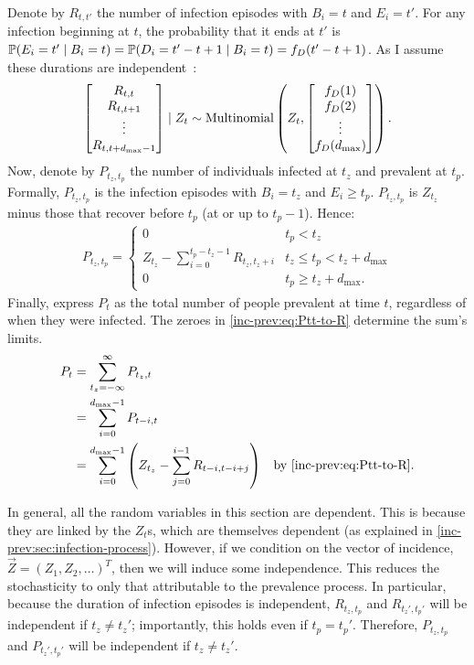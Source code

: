 \documentclass[thesis.tex]{subfiles}
\begin{document}
Denote by $R_{t,t'}$ the number of infection episodes with $B_i=t$ and $E_i=t'$.
For any infection beginning at $t$, the probability that it ends at $t'$ is $\operatorname{\mathbb{P}}(E_i = t' \mid B_i = t) = \operatorname{\mathbb{P}}(D_i = t' - t + 1 \mid B_i = t) = f_D(t' - t + 1)$.
As I assume these durations are independent~\autocite{paganoHIV}:
\begin{align}
\begin{bmatrix}
  R_{t,t} \\ R_{t,t+1} \\ \vdots \\ R_{t,t+d_\text{max}-1}
\end{bmatrix} \mid Z_t
\sim \operatorname{Multinomial} \left(
  Z_t, 
  \begin{bmatrix}
    f_D(1) \\ f_D(2) \\ \vdots \\ f_D(d_\text{max})
  \end{bmatrix}
\right).
\end{align}
Now, denote by $P_{t_z,t_p}$ the number of individuals infected at $t_z$ and prevalent at $t_p$.
Formally, $P_{t_z,t_p}$ is the infection episodes with $B_i = t_z$ and $E_i \geq t_p$.
$P_{t_z,t_p}$ is $Z_{t_z}$ minus those that recover before $t_p$ (\ie at or up to $t_p - 1$).
Hence:
\begin{align}
    P_{t_z,t_p} = \begin{cases}
      0 &t_p < t_z\\
      Z_{t_z} - \sum_{i=0}^{t_p-t_z-1} R_{t_z,t_z+i} &t_z \leq t_p < t_z + d_\text{max}\\
      0 &t_p \geq t_z + d_\text{max}.
  \end{cases} \label{inc-prev:eq:Ptt-to-R}
\end{align}
Finally, express $P_t$ as the total number of people prevalent at time $t$, regardless of when they were infected.
The zeroes in \cref{inc-prev:eq:Ptt-to-R} determine the sum's limits.
\begin{align}
  P_t
  &= \sum_{t_z=-\infty}^\infty P_{t_z,t} \\
  &= \sum_{i=0}^{\dmax-1} P_{t-i,t} \label{inc-prev:eq:Pt-to-Ptt} \\
  &= \sum_{i=0}^{\dmax-1} \left(Z_{t_z} - \sum_{j=0}^{i-1} R_{t-i,t-i+j} \right) &\text{by \cref{inc-prev:eq:Ptt-to-R}}\label{inc-prev:eq:Pt-to-Rtt}.
\end{align}

In general, all the random variables in this section are dependent.
This is because they are linked by the $Z_t$s, which are themselves dependent (as explained in \cref{inc-prev:sec:infection-process}).
However, if we condition on the vector of incidence, $\vec{Z} = (Z_1, Z_2, \dots)^T$, then we will induce some independence.
This reduces the stochasticity to only that attributable to the prevalence process.
In particular, because the duration of infection episodes is independent, $R_{t_z,t_p}$ and $R_{t_z',t_p'}$ will be independent if $t_z \neq t_z'$; importantly, this holds even if $t_p = t_p'$.
Therefore, $P_{t_z,t_p}$ and $P_{t_z',t_p'}$ will be independent if $t_z \neq t_z'$.
\end{document}
